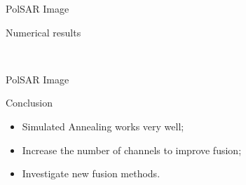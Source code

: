 \documentclass[10pt]{beamer}
\begin{document}
\begin{frame}[fragile]{PolSAR Image}
\begin{alertblock}{Numerical results}
	\begin{figure}[hbt]
	\centering
     \quad
     \\
     \quad
     \label{evidencias_hh_hv_vv}
   \end{figure}	
\end{alertblock}
\end{frame}

\begin{frame}[fragile]{PolSAR Image}
\begin{alertblock}{Conclusion}
\begin{itemize}
	\item Simulated Annealing works very well;
	\item Increase the number of channels to improve fusion;
	\item Investigate new fusion methods.
\end{itemize}
\end{alertblock}
\end{frame}

\begin{frame}[allowframebreaks]


\end{frame}
\end{document}
